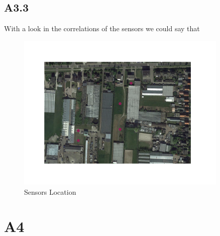 \documentclass[a4paper,12pt]{article}
\begin{document}
 \subsection{A3.3}
 With a look in the correlations of the sensors we could say that 
\begin{figure}[H] 
	\centering
	\includegraphics[width=0.9\textwidth]{Sensors Location.png}
	\caption{Sensors Location}
\end{figure}
\section{A4}
\end{document}
